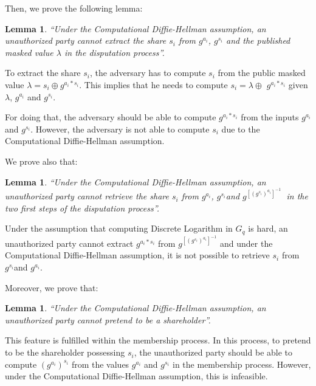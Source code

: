 \documentclass[submission,copyright,creativecommons]{eptcs}
\newtheorem{lemma}[theorem]{Lemma}
\newenvironment{proof}[1][Proof]{\begin{trivlist}
\item[\hskip \labelsep {\bfseries #1}]}{\end{trivlist}}
\begin{document}
Then, we prove the following lemma:

\begin{lemma}
\textquotedblleft Under the Computational Diffie-Hellman assumption, an
unauthorized party cannot extract the share $s_{i}$ from $g^{a_{i}}$, $g^{s_{i}}$ and the published masked value $\lambda$ in the
disputation process\textquotedblright .
\end{lemma}

\begin{proof}
To extract the share $s_{i}$, the adversary has to compute $s_{i}$ from the
public masked value $\lambda =s_{i}\oplus g^{a_{i}\ast s_{i}}$. This implies
that he needs to compute $s_{i}=\lambda \oplus $ $g^{a_{i}\ast s_{i}}$ given 
$\lambda $, $g^{a_{i}}$ and $g^{s_{i}}$. 

For doing that, the adversary
should be able to compute $g^{a_{i}\ast s_{i}}$ from the inputs $g^{a_{i}}$ and $g^{s_{i}}$. However, the adversary is not able to compute $s_{i}$ due to the Computational Diffie-Hellman assumption.
\end{proof}

We prove also that:

\begin{lemma}
\textquotedblleft Under the Computational Diffie-Hellman assumption, an unauthorized
party cannot retrieve the share $s_{i}$ from $g^{a_{i}}$, $g^{s_{i}}$and $g^{[(g^{s_{i}})^{a_{i}}]^{-1}}$\textbf{\ }in the two first steps of the
disputation process\textquotedblright .
\end{lemma}

\begin{proof}
Under the assumption that computing Discrete Logarithm in $G_{q}$ is hard,
an unauthorized party cannot extract $g^{a_{i}\ast s_{i}}$ from $g^{[(g^{s_{i}})^{a_{i}}]^{-1}}$ and under the Computational Diffie-Hellman
assumption, it is not possible to retrieve $s_{i}$ from $g^{s_{i}}$and $g^{a_{i}}$.
\end{proof}

Moreover, we prove that:

\begin{lemma}
\textquotedblleft Under the Computational Diffie-Hellman assumption, an
unauthorized party cannot pretend to be a shareholder\textquotedblright .
\end{lemma}

\begin{proof}
This feature is fulfilled within the membership process. In this process, to
pretend to be the shareholder possessing $s_{i}$, the unauthorized party
should be able to compute $(g^{a_{i}})^{s_{i}}$ from the values $g^{a_{i}}$
and $g^{s_{i}}$ in the membership process. However, under the Computational
Diffie-Hellman assumption, this is infeasible.
\end{proof}
\end{document}
